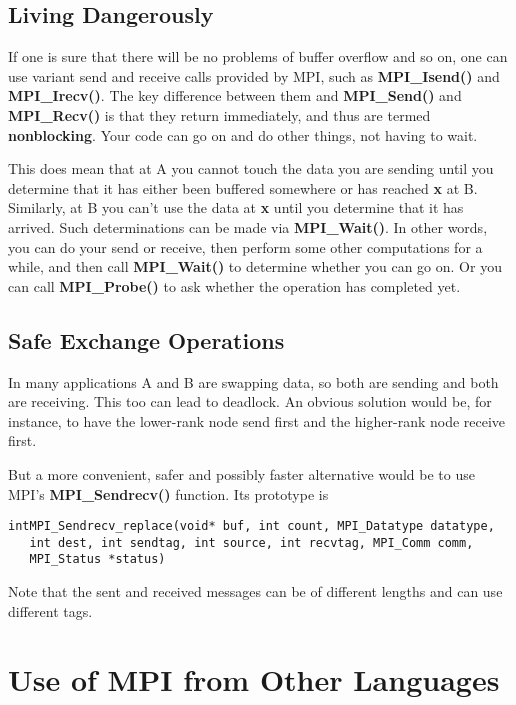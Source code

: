 \subsection{Living Dangerously}

If one is sure that there will be no problems of buffer overflow and so
on, one can use variant send and receive calls provided by MPI, such as
{\bf MPI\_Isend()} and {\bf MPI\_Irecv()}.  The key difference between
them and {\bf MPI\_Send()} and {\bf MPI\_Recv()} is that they return
immediately, and thus are termed {\bf nonblocking}.  Your code can go on
and do other things, not having to wait.

This does mean that at A you cannot touch the data you are sending until
you determine that it has either been buffered somewhere or has reached
{\bf x} at B.  Similarly, at B you can't use the data at {\bf x} until
you determine that it has arrived.  Such determinations can be made via
{\bf MPI\_Wait()}.  In other words, you can do your send or receive,
then perform some other computations for a while, and then call {\bf
MPI\_Wait()} to determine whether you can go on.  Or you can call {\bf
MPI\_Probe()} to ask whether the operation has completed yet.

\subsection{Safe Exchange Operations}

In many applications A and B are swapping data, so both are sending and
both are receiving.  This too can lead to deadlock.  An obvious solution
would be, for instance, to have the lower-rank node send first and the
higher-rank node receive first.  

But a more convenient, safer and possibly faster alternative would be to
use MPI's {\bf MPI\_Sendrecv()} function.  Its prototype is

\begin{Verbatim}[fontsize=\relsize{-2}]
intMPI_Sendrecv_replace(void* buf, int count, MPI_Datatype datatype, 
   int dest, int sendtag, int source, int recvtag, MPI_Comm comm, 
   MPI_Status *status) 
\end{Verbatim}

Note that the sent and received messages can be of different lengths and
can use different tags.

\section{Use of MPI from Other Languages}

